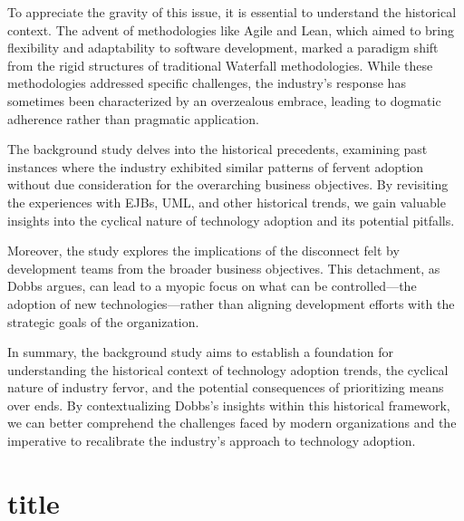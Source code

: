 \documentclass[a4Paper]{article}
\begin{document}
To appreciate the gravity of this issue, it is essential to understand the historical context. The advent of methodologies like Agile and Lean, which aimed to bring flexibility and adaptability to software development, marked a paradigm shift from the rigid structures of traditional Waterfall methodologies. While these methodologies addressed specific challenges, the industry's response has sometimes been characterized by an overzealous embrace, leading to dogmatic adherence rather than pragmatic application.

The background study delves into the historical precedents, examining past instances where the industry exhibited similar patterns of fervent adoption without due consideration for the overarching business objectives. By revisiting the experiences with EJBs, UML, and other historical trends, we gain valuable insights into the cyclical nature of technology adoption and its potential pitfalls.

Moreover, the study explores the implications of the disconnect felt by development teams from the broader business objectives. This detachment, as Dobbs argues, can lead to a myopic focus on what can be controlled—the adoption of new technologies—rather than aligning development efforts with the strategic goals of the organization.

In summary, the background study aims to establish a foundation for understanding the historical context of technology adoption trends, the cyclical nature of industry fervor, and the potential consequences of prioritizing means over ends. By contextualizing Dobbs's insights within this historical framework, we can better comprehend the challenges faced by modern organizations and the imperative to recalibrate the industry's approach to technology adoption.
\pagebreak
\section{title}
%

%
\end{document}

